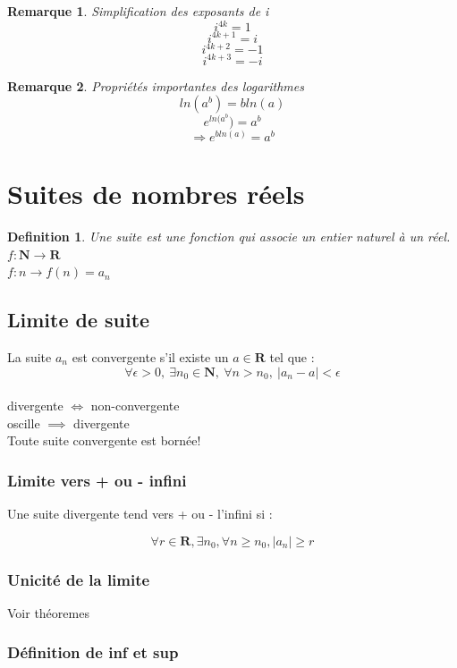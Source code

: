 \documentclass{article}
\newtheorem{definition}{Definition}[section]
\newtheorem{remark}{Remarque}[section]
\begin{document}
\begin{remark}
Simplification des exposants de i
    \[ i^{4k} = 1 \]
    \[ i^{4k+1} = i \]
    \[ i^{4k+2} = -1 \] 
    \[ i^{4k+3} = -i \]
\end{remark}
\begin{remark}
Propriétés importantes des logarithmes
    \[ ln(a^{b}) = bln(a) \]
    \[ e^{ln(a^{b}}) = a^{b} \]
    \[ \Rightarrow e^{bln(a)} = a^{b} \]
\end{remark}

\section{Suites de nombres réels}

\begin{definition}
Une suite est une fonction qui associe un entier naturel à un réel. \\
    $ f : \mathbf{N} \rightarrow \mathbf{R} $ \\
    $ f : n \rightarrow f(n) = a_n $
\end{definition}

\subsection{Limite de suite}

La suite $ a_n $ est convergente s'il existe un $ a \in \mathbf{R} $ tel que : \\
\[ \forall \epsilon > 0,\ \exists n_0 \in \mathbf{N},\ \forall n > n_0,\ |a_n - a| < \epsilon \]\\
divergente $ \Leftrightarrow $ non-convergente\\
oscille $ \implies $ divergente \\
Toute suite convergente est bornée!

\subsubsection{Limite vers + ou - infini}

Une suite divergente tend vers + ou - l'infini si :

\[ \forall r \in \mathbf{R}, \exists n_0, \forall n \geq n_0, |a_n|  \geq r \]

\subsubsection{Unicité de la limite}
Voir théoremes

\subsubsection{Définition de inf et sup}
\end{document}
